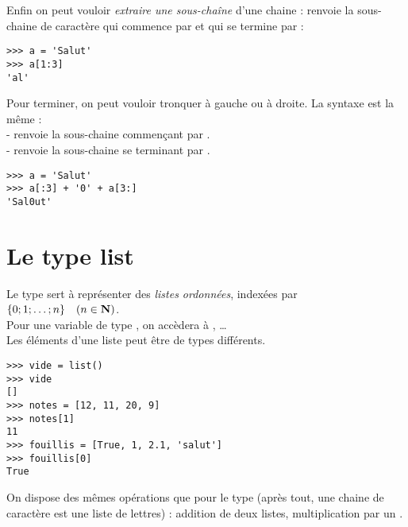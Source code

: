 Enfin on peut vouloir \textit{extraire une sous-chaîne} d'une chaine :  renvoie la sous-chaine de caractère qui commence par
 et qui se termine par  :

\begin{pys}\begin{verbatim}
>>> a = 'Salut'
>>> a[1:3]
'al'
\end{verbatim}
\end{pys}

Pour terminer, on peut vouloir tronquer à gauche ou à droite. La syntaxe est la même :\\
-  renvoie la sous-chaine commençant par .\\
-   renvoie la sous-chaine se terminant par .

\begin{pys}\begin{verbatim}
>>> a = 'Salut'
>>> a[:3] + '0' + a[3:]
'Sal0ut'
\end{verbatim}
\end{pys}

\section{Le type list}

Le type  sert à représenter des \textit{listes ordonnées}, indexées par $\lbrace 0;1;\ldots ;n\rbrace\quad (n\in\mathbf{N})$.\\
Pour une variable  de type , on accèdera à , \ldots\\
Les éléments d'une liste peut être de types différents.

\begin{pys}\begin{verbatim}
>>> vide = list()
>>> vide
[]
>>> notes = [12, 11, 20, 9]
>>> notes[1]
11
>>> fouillis = [True, 1, 2.1, 'salut']
>>> fouillis[0]
True
\end{verbatim}
\end{pys}

On dispose des mêmes opérations que pour le type  (après tout, une chaine de caractère est une liste de lettres) : addition de deux listes, multiplication par un .\\

